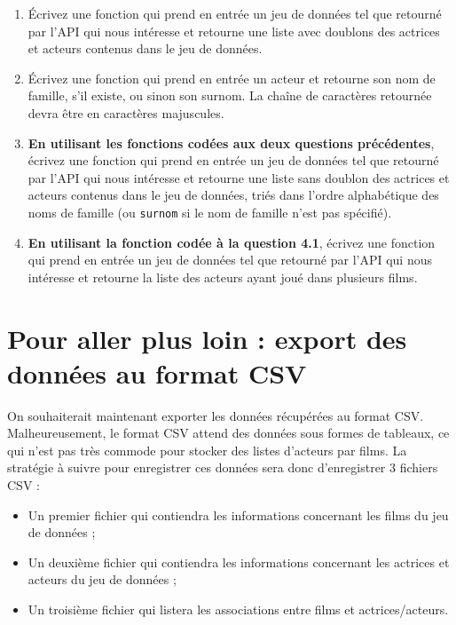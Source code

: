 \documentclass[11pt,a4paper]{article}
\begin{document}
\begin{enumerate}
    \item Écrivez une fonction qui prend en entrée un jeu de données tel que retourné par l'API qui nous intéresse et retourne une liste avec doublons des actrices et acteurs contenus dans le jeu de données.
    
    \item Écrivez une fonction qui prend en entrée un acteur et retourne son nom de famille, s'il existe, ou sinon son surnom. La chaîne de caractères retournée devra être en caractères majuscules.
    
    \item \textbf{En utilisant les fonctions codées aux deux questions précédentes}, écrivez une fonction qui prend en entrée un jeu de données tel que retourné par l'API qui nous intéresse et retourne une liste sans doublon des actrices et acteurs contenus dans le jeu de données, triés dans l'ordre alphabétique des noms de famille (ou \verb+surnom+ si le nom de famille n'est pas spécifié).
    
    \item \textbf{En utilisant la fonction codée à la question 4.1}, écrivez une fonction qui prend en entrée un jeu de données tel que retourné par l'API qui nous intéresse et retourne la liste des acteurs ayant joué dans plusieurs films.
\end{enumerate}

\section{Pour aller plus loin : export des données au format CSV}

On souhaiterait maintenant exporter les données récupérées au format CSV.
Malheureusement, le format CSV attend des données sous formes de tableaux, ce qui n'est pas très commode pour stocker des listes d'acteurs par films.
La stratégie à suivre pour enregistrer ces données sera donc d'enregistrer 3 fichiers CSV :
\begin{itemize}
    \item Un premier fichier qui contiendra les informations concernant les films du jeu de données ;
    \item Un deuxième fichier qui contiendra les informations concernant les actrices et acteurs du jeu de données ;
    \item Un troisième fichier qui listera les associations entre films et actrices/acteurs.
\end{itemize}
\end{document}
